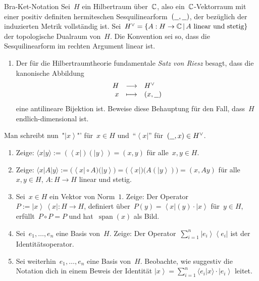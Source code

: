 \documentclass{pizzablatt}
\newcommand{\bra}[1]{\left\langle #1 \right|}
\newcommand{\ket}[1]{\left| #1 \right\rangle}
\begin{document}
\begin{aufgabe}{Bra-Ket-Notation}
Sei~$H$ ein Hilbertraum über~$\mathbb{C}$, also ein~$\mathbb{C}$-Vektorraum mit einer
positiv definiten hermiteschen Sesquilinearform~$(\underline{\ \ },\underline{\ \ })$, der
bezüglich der induzierten Metrik vollständig ist. Sei~$H^\vee =
\{ A : H \to \mathbb{C} \,|\, \text{$A$ linear und stetig} \}$ der topologische
Dualraum von~$H$. Die Konvention sei so, dass die Sesquilinearform im rechten
Argument linear ist.

\begin{enumerate}
\item Der für die Hilbertraumtheorie fundamentale \emph{Satz von Riesz} besagt,
dass die kanonische Abbildung
\[ \begin{array}{@{}rcl@{}}
  H &\longrightarrow& H^\vee \\
  x &\longmapsto& (x, \freist)
\end{array} \]
eine antilineare Bijektion ist. Beweise diese Behauptung für den Fall, dass~$H$
endlich-dimensional ist.
\end{enumerate}

Man schreibt nun~"$\ket{x}$"' für~$x \in H$ und~"`$\bra{x}$"' für~$(\underline{\ \ },x)
\in H^\vee$.

\begin{enumerate}
\addtocounter{enumi}{1}
\item Zeige: $\langle x|y \rangle := (\bra{x})(\ket{y}) = (x,y)$ für
alle~$x,y \in H$.
\item Zeige: $\langle x|A|y \rangle := \bigl(\bra{x} \circ A\bigr)
\bigl(\ket{y}\bigr) = \bigl(\bra{x}\bigr) \bigl(A(\ket{y})\bigr) = (x,Ay)$ für
alle~$x,y \in H$, $A : H \to H$ linear und stetig.
\item Sei~$x \in H$ ein Vektor von Norm~$1$. Zeige: Der Operator~$P := \ket{x} \, \bra{x} : H \to H$, definiert
über~$P(y) = \bra{x}(y) \cdot \ket{x}$ für~$y \in H$, erfüllt~$P \circ P = P$
und hat~$\operatorname{span}(x)$ als Bild.
\item Sei~$e_1,\ldots,e_n$ eine Basis von~$H$. Zeige: Der
Operator~$\sum_{i=1}^n \ket{e_i} \bra{e_i}$ ist der Identitätsoperator.
\item Sei weiterhin~$e_1,\ldots,e_n$ eine Basis von~$H$. Beobachte, wie
suggestiv die Notation dich in einem Beweis der Identität $\ket{x} =
\sum_{i=1}^n \langle e_i|x \rangle \cdot \ket{e_i}$ leitet.
\end{enumerate}
\end{aufgabe}
\end{document}
